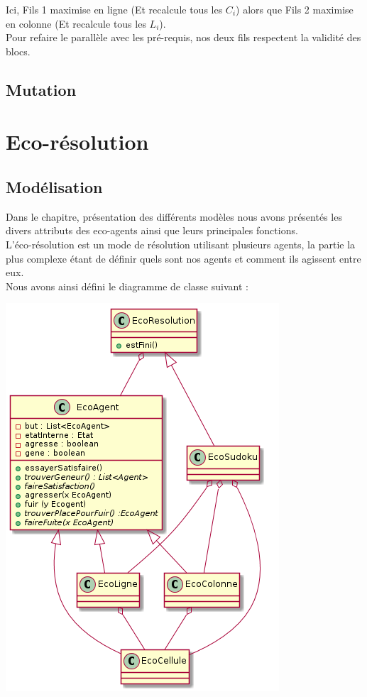                     Ici, Fils 1 maximise en ligne (Et recalcule tous les $C_i$) alors que Fils 2 maximise en colonne (Et recalcule tous les $L_i$).\\

                    Pour refaire le parallèle avec les pré-requis, nos deux fils respectent la validité des blocs.
        \subsection{Mutation}


    \section{Eco-résolution}
    \subsection{Modélisation}
    Dans le chapitre, présentation des différents modèles nous avons présentés les divers attributs des eco-agents ainsi que leurs principales fonctions. \\
    L'éco-résolution est un mode de résolution utilisant plusieurs agents, la partie la plus complexe étant de définir quels sont nos agents et comment ils agissent entre eux. \\
    Nous avons ainsi défini le diagramme de classe suivant : \\
    \begin{center}
    \includegraphics[scale=0.7]{diagrams/ecoResolution.png}
    \end{center} 

